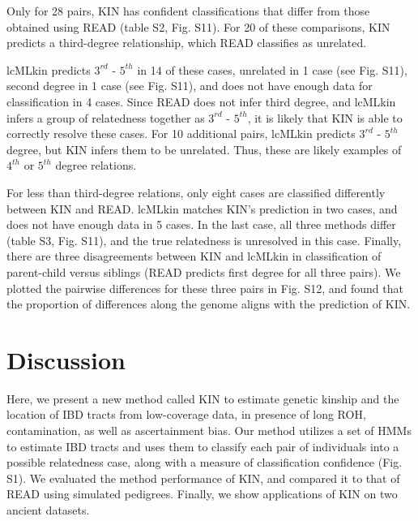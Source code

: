 \documentclass[12pt, letterpaper]{article}
\begin{document}
Only for 28 pairs, KIN has confident classifications that differ from those obtained using READ (table S2, Fig. S11). For 20 of these comparisons, KIN predicts a third-degree relationship, which READ classifies as unrelated. 

lcMLkin predicts $3^{rd}$ - $5^{th}$ in 14 of these cases, unrelated in 1 case (see Fig. S11), second degree in 1 case (see Fig. S11), and does not have enough data for classification in 4 cases. Since READ does not infer third degree, and lcMLkin infers a group of relatedness together as $3^{rd}$ - $5^{th}$, it is likely that KIN is able to correctly resolve these cases. For 10 additional pairs, lcMLkin predicts $3^{rd}$ - $5^{th}$ degree, but KIN infers them to be unrelated. Thus, these are likely examples of $4^{th}$ or $5^{th}$ degree relations.

For less than third-degree relations, only eight cases are classified differently between KIN and READ. lcMLkin matches KIN's prediction in two cases, and does not have enough data in 5 cases. In the last case, all three methods differ (table S3, Fig. S11), and the true relatedness is unresolved in this case. Finally, there are three disagreements between KIN and lcMLkin in classification of parent-child versus siblings (READ predicts first degree for all three pairs). We plotted the pairwise differences for these three pairs in Fig. S12, and found that the proportion of differences along the genome aligns with the prediction of KIN.



\section{Discussion}\label{discussion}
Here, we present a new method called KIN to estimate genetic kinship and the location of IBD tracts from low-coverage data, in presence of long ROH, contamination, as well as ascertainment bias. Our method utilizes a set of HMMs to estimate IBD tracts and uses them to classify each pair of individuals into a possible relatedness case, along with a measure of classification confidence (Fig. S1). We evaluated the method performance of KIN, and compared it to that of READ using simulated pedigrees. Finally, we show applications of KIN on two ancient datasets.
\end{document}
